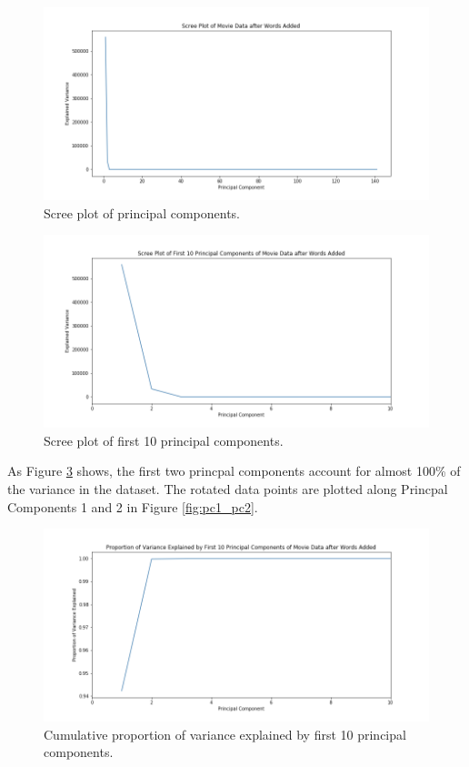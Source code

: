 \documentclass[12pt, oneside]{article}   	%
\begin{document}
\begin{figure}%
\includegraphics[width=\textwidth]{scree_whole}
\caption{\label{fig:scree_whole}Scree plot of principal components.}
\end{figure}

\begin{figure}%
\includegraphics[width=\textwidth]{scree_first_10}
\caption{\label{fig:scree_first_10}Scree plot of first 10 principal components.}
\end{figure}

As Figure \ref{fig:pca_var_explained} shows, the first two princpal components account for almost 100\% of the variance in the dataset. The rotated data points are plotted along Princpal Components 1 and 2 in Figure \ref{fig:pc1_pc2}.

\begin{figure}%
\includegraphics[width=\textwidth]{pca_var_explained}
\caption{\label{fig:pca_var_explained}Cumulative proportion of variance explained by first 10 principal components.}
\end{figure}
\end{document}
